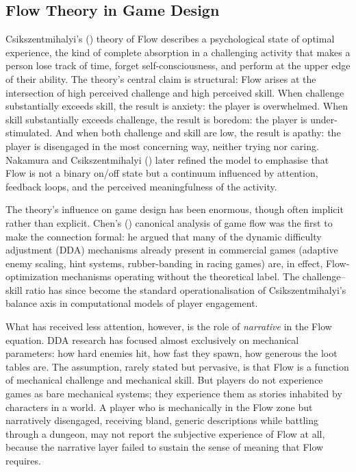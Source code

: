 \subsection{Flow Theory in Game Design}

Csikszentmihalyi's (\citeyear{csikszentmihalyi1990flow}) theory of Flow describes a psychological state of optimal experience, the kind of complete absorption in a challenging activity that makes a person lose track of time, forget self-consciousness, and perform at the upper edge of their ability. The theory's central claim is structural: Flow arises at the intersection of high perceived challenge and high perceived skill. When challenge substantially exceeds skill, the result is anxiety: the player is overwhelmed. When skill substantially exceeds challenge, the result is boredom: the player is under-stimulated. And when both challenge and skill are low, the result is apathy: the player is disengaged in the most concerning way, neither trying nor caring. Nakamura and Csikszentmihalyi (\citeyear{nakamura2002concept}) later refined the model to emphasise that Flow is not a binary on/off state but a continuum influenced by attention, feedback loops, and the perceived meaningfulness of the activity.

The theory's influence on game design has been enormous, though often implicit rather than explicit. Chen's (\citeyear{chen2007flow}) canonical analysis of game flow was the first to make the connection formal: he argued that many of the dynamic difficulty adjustment (DDA) mechanisms already present in commercial games (adaptive enemy scaling, hint systems, rubber-banding in racing games) are, in effect, Flow-optimization mechanisms operating without the theoretical label. The challenge--skill ratio has since become the standard operationalisation of Csikszentmihalyi's balance axis in computational models of player engagement.

What has received less attention, however, is the role of \textit{narrative} in the Flow equation. DDA research has focused almost exclusively on mechanical parameters: how hard enemies hit, how fast they spawn, how generous the loot tables are. The assumption, rarely stated but pervasive, is that Flow is a function of mechanical challenge and mechanical skill. But players do not experience games as bare mechanical systems; they experience them as stories inhabited by characters in a world. A player who is mechanically in the Flow zone but narratively disengaged, receiving bland, generic descriptions while battling through a dungeon, may not report the subjective experience of Flow at all, because the narrative layer failed to sustain the sense of meaning that Flow requires.

